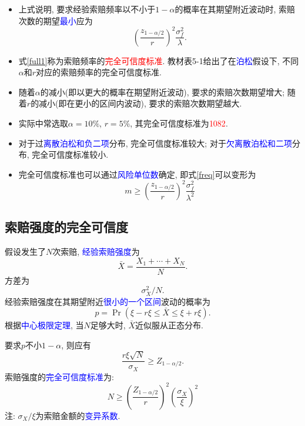 \documentclass[professionalfont]{beamer}
\newcommand{\red}[1]{\textcolor{red}{#1}}
\newcommand{\blue}[1]{\textcolor{blue}{#1}}
\begin{document}
\begin{frame}
\begin{itemize}
\item 上式说明, 要求经验索赔频率以不小于$1-\alpha$的概率在其期望附近波动时, 索赔次数的期望\blue{最小}应为
\begin{equation}\label{full1}
\left(\frac{z_{1-\alpha/2}}{r}\right)^2\frac{\sigma^2_f}{\lambda}.
\end{equation}
\item 式\eqref{full1}称为索赔频率的\red{完全可信度标准}.
教材表5-1给出了在\blue{泊松}假设下, 不同$\alpha$和$r$对应的索赔频率的完全可信度标准.
\end{itemize}
\end{frame}

\begin{frame}
\begin{itemize}
\item 随着$\alpha$的减小(即以更大的概率在期望附近波动), 要求的索赔次数期望增大;  随着$r$的减小(即在更小的区间内波动), 要求的索赔次数期望越大. 
\item 实际中常选取$\alpha=10\%$, $r=5\%$, 其完全可信度标准为\red{1082}.
\item 对于过\blue{离散泊松和负二项}分布, 完全可信度标准较大; 对于\blue{欠离散泊松和二项}分布, 完全可信度标准较小.
\item 完全可信度标准也可以通过\blue{风险单位数}确定, 即式\eqref{freq}可以变形为
$$m \geq\left(\frac{z_{1-\alpha/2}}{r}\right)^2\frac{\sigma^2_f}{\lambda^2}$$
\end{itemize}
\end{frame}



\subsection{索赔强度的完全可信度}
\begin{frame}
假设发生了$N$次索赔, \blue{经验索赔强度}为
$$\bar{X}=\frac{X_1+\cdots+X_N}{N}.$$
方差为\begin{equation}\label{severity}\sigma^2_X/N.\end{equation}经验索赔强度在其期望附近\blue{很小的一个区间}波动的概率为
$$p=\Pr\left(\xi-r\xi \leq \bar{X} \leq \xi+r\xi\right).$$
根据\blue{中心极限定理}, 当$N$足够大时, $\bar{X}$近似服从正态分布.  
\end{frame}

\begin{frame}
要求$p$不小$1-\alpha$, 则应有
$$\frac{r\xi\sqrt{N}}{\sigma_X}\geq Z_{1-\alpha/2}.$$
索赔强度的\blue{完全可信度标准}为:
$$N\geq \left(\frac{Z_{1-\alpha/2}}{r}\right)^2\left(\frac{\sigma_X}{\xi}\right)^2$$
注: $\sigma_X/\xi$为索赔金额的\blue{变异系数}.
\end{frame}
\end{document}

